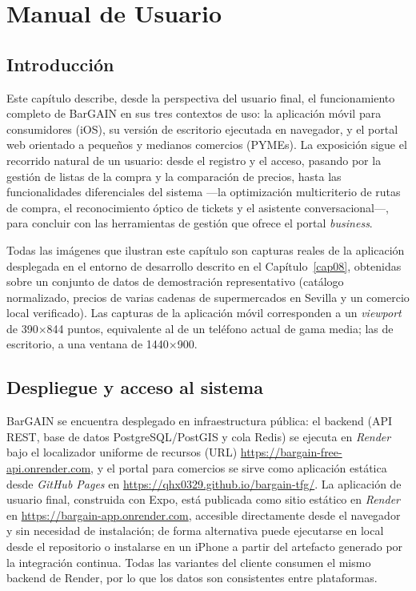 
\chapter{Manual de Usuario}\label{cap09}

\section{Introducci\'on}\label{sec:manual-intro}

Este cap\'itulo describe, desde la perspectiva del usuario final, el funcionamiento completo de
BarGAIN en sus tres contextos de uso: la aplicaci\'on m\'ovil para consumidores (iOS),
su versi\'on de escritorio ejecutada en navegador, y el portal web orientado a peque\~nos y
medianos comercios (PYMEs). La exposici\'on sigue el recorrido natural de un usuario: desde el
registro y el acceso, pasando por la gesti\'on de listas de la compra y la comparaci\'on de
precios, hasta las funcionalidades diferenciales del sistema ---la optimizaci\'on multicriterio de
rutas de compra, el reconocimiento \'optico de tickets y el asistente conversacional---, para
concluir con las herramientas de gesti\'on que ofrece el portal \emph{business}.

Todas las im\'agenes que ilustran este cap\'itulo son capturas reales de la aplicaci\'on
desplegada en el entorno de desarrollo descrito en el Cap\'itulo~\ref{cap08}, obtenidas sobre un
conjunto de datos de demostraci\'on representativo (cat\'alogo normalizado, precios de varias
cadenas de supermercados en Sevilla y un comercio local verificado). Las capturas de la
aplicaci\'on m\'ovil corresponden a un \emph{viewport} de 390$\times$844 puntos, equivalente al
de un tel\'efono actual de gama media; las de escritorio, a una ventana de 1440$\times$900.

\section{Despliegue y acceso al sistema}\label{sec:manual-requisitos}

BarGAIN se encuentra desplegado en infraestructura p\'ublica: el backend (API REST, base de
datos PostgreSQL/PostGIS y cola Redis) se ejecuta en \emph{Render} bajo el localizador uniforme de
recursos (URL) \url{https://bargain-free-api.onrender.com}, y el portal para comercios se sirve
como
aplicaci\'on est\'atica desde \emph{GitHub Pages} en
\url{https://qhx0329.github.io/bargain-tfg/}. La aplicaci\'on de usuario final, construida
con Expo, est\'a publicada como sitio est\'atico en \emph{Render} en
\url{https://bargain-app.onrender.com}, accesible directamente desde el navegador y sin
necesidad de instalaci\'on; de forma alternativa puede ejecutarse en local desde el repositorio
o instalarse en un iPhone a partir del artefacto generado por la integraci\'on continua. Todas
las variantes del cliente consumen el mismo backend de Render, por lo que los datos son
consistentes entre plataformas.

